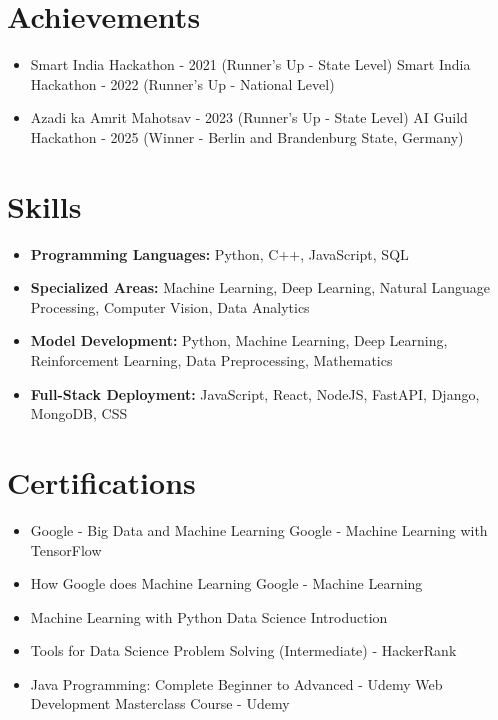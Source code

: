 \documentclass[a4paper,10pt]{article}
\begin{document}
\section*{Achievements}
\begin{itemize}
\item Smart India Hackathon - 2021 (Runner's Up - State Level) \hfill Smart India Hackathon - 2022 (Runner's Up - National Level)
\item Azadi ka Amrit Mahotsav - 2023 (Runner's Up - State Level) \hfill AI Guild Hackathon - 2025 (Winner - Berlin and Brandenburg State, Germany)
\end{itemize}

\section*{Skills}
\begin{itemize}
  \item \textbf{Programming Languages:} Python, C++, JavaScript, SQL
  \item \textbf{Specialized Areas:} Machine Learning, Deep Learning, Natural Language Processing, Computer Vision, Data Analytics
  \item \textbf{Model Development:} Python, Machine Learning, Deep Learning, Reinforcement Learning, Data Preprocessing, Mathematics
  \item \textbf{Full-Stack Deployment:} JavaScript, React, NodeJS, FastAPI, Django, MongoDB, CSS
\end{itemize}

\section*{Certifications}
\begin{itemize}
\item Google - Big Data and Machine Learning \hfill Google - Machine Learning with TensorFlow
\item How Google does Machine Learning \hfill Google - Machine Learning
\item Machine Learning with Python \hfill Data Science Introduction
\item Tools for Data Science \hfill Problem Solving (Intermediate) - HackerRank
\item Java Programming: Complete Beginner to Advanced - Udemy \hfill Web Development Masterclass Course - Udemy
\end{itemize}
\end{document}
